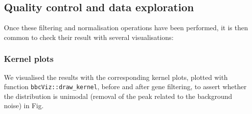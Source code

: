 \begin{Shaded}
\begin{Highlighting}
\OtherTok{\textless{}{-}}\SpecialCharTok{::}\NormalTok{(}
  \SpecialCharTok{::}
  \SpecialCharTok{::}
   \SpecialCharTok{\textasciitilde{}}  \SpecialCharTok{+}

\OtherTok{\textless{}{-}}\SpecialCharTok{::}\SpecialCharTok{\%\textgreater{}\%}\SpecialCharTok{::}\NormalTok{(}

\OtherTok{\textless{}{-}}\SpecialCharTok{::}\NormalTok{(}
\end{Highlighting}
\end{Shaded}


\subsection{Quality control and data exploration} 
\label{quality-control-and-data-exploration}

Once these filtering and normalisation operations have been performed, it is then common to check their result with several visualisations:


\subsubsection{Kernel plots} 
\label{subsec:kernel-plot}

We visualised the results with the corresponding kernel plots, plotted with function \texttt{bbcViz::draw\_kernel}, before and after gene filtering, to assert whether the distribution is unimodal (removal of the peak related to the background noise) in Fig. 

